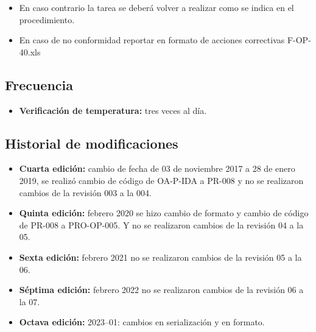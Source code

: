 \begin{itemize}
	\item En caso contrario la tarea se deberá volver a realizar como se indica en el procedimiento.
	\item En caso de no conformidad reportar en formato de acciones correctivas F-OP-40.xls
\end{itemize}

\subsection{Frecuencia}

\begin{itemize}
	\item \textbf{Verificación de temperatura:} tres veces al día.
\end{itemize}

\subsection{Historial de modificaciones}

\begin{itemize}
	\item \textbf{Cuarta edición:} cambio de fecha de 03 de noviembre 2017 a 28 de enero 2019, se realizó cambio de código de OA-P-IDA a PR-008 y no se realizaron cambios de la revisión 003 a la 004.
	\item \textbf{Quinta edición:} febrero 2020 se hizo cambio de formato y cambio de código de PR-008 a PRO-OP-005. Y no se realizaron cambios de la revisión 04 a la 05.
	\item \textbf{Sexta edición:} febrero 2021 no se realizaron cambios de la revisión 05 a la 06.
	\item \textbf{Séptima edición:} febrero 2022 no se realizaron cambios de la revisión 06 a la 07.
	\item \textbf{Octava edición:} 2023--01: cambios en serialización y en formato.
\end{itemize}
